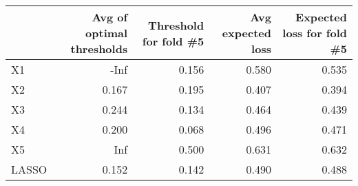 
\begin{tabular}{lrrrr}
\toprule
  & Avg of optimal thresholds & Threshold for fold \#5 & Avg expected loss & Expected loss for fold \#5\\
\midrule
X1 & -Inf & 0.156 & 0.580 & 0.535\\
X2 & 0.167 & 0.195 & 0.407 & 0.394\\
X3 & 0.244 & 0.134 & 0.464 & 0.439\\
X4 & 0.200 & 0.068 & 0.496 & 0.471\\
X5 & Inf & 0.500 & 0.631 & 0.632\\
LASSO & 0.152 & 0.142 & 0.490 & 0.488\\
\bottomrule
\end{tabular}